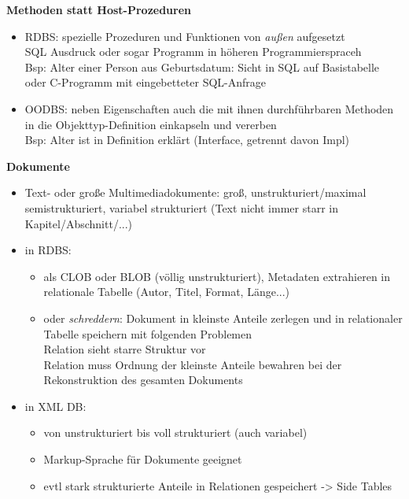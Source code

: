 \textbf{Methoden statt Host-Prozeduren}
\begin{itemize}
	\item RDBS: spezielle Prozeduren und Funktionen von \textit{außen} aufgesetzt\\
	SQL Ausdruck oder sogar Programm in höheren Programmierspraceh\\
	Bsp: Alter einer Person aus Geburtsdatum: Sicht in SQL auf Basistabelle oder C-Programm mit eingebetteter SQL-Anfrage
	
	\item OODBS: neben Eigenschaften auch die mit ihnen durchführbaren Methoden in die Objekttyp-Definition einkapseln und vererben\\
	Bsp: Alter ist in Definition erklärt (Interface, getrennt davon Impl)
\end{itemize}

\textbf{Dokumente}
\begin{itemize}
	\item Text- oder große Multimediadokumente: groß, unstrukturiert/maximal semistrukturiert, variabel strukturiert (Text nicht immer starr in Kapitel/Abschnitt/...)
	
	\item in RDBS:
	\begin{itemize}
		\item als CLOB oder BLOB (völlig unstrukturiert), Metadaten extrahieren in relationale Tabelle (Autor, Titel, Format, Länge...)
		\item oder \textit{schreddern}: Dokument in kleinste Anteile zerlegen und in relationaler Tabelle speichern mit folgenden Problemen\\
		Relation sieht starre Struktur vor\\
		Relation muss Ordnung der kleinste Anteile bewahren bei der Rekonstruktion des gesamten Dokuments
	\end{itemize}
	
	\item in XML DB:
	\begin{itemize}
		\item von unstrukturiert bis voll strukturiert (auch variabel)
		\item Markup-Sprache für Dokumente geeignet
		\item evtl stark strukturierte Anteile in Relationen gespeichert -> Side Tables
	\end{itemize}
\end{itemize}

